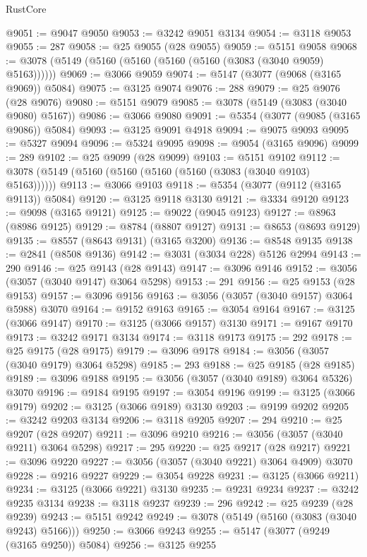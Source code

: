 \begin{lexlean}{RustCore}
\begin{coremodule}
@9051 := @9047 @9050
@9053 := @3242 @9051 @3134
@9054 := @3118 @9053
@9055 := 287
@9058 := @25 @9055 (@28 @9055)
@9059 := @5151 @9058
@9068 := @3078 (@5149 (@5160 (@5160 (@5160 (@5160 (@3083 (@3040 @9059) @5163))))))
@9069 := @3066 @9059
@9074 := @5147 (@3077 (@9068 (@3165 @9069)) @5084)
@9075 := @3125 @9074
@9076 := 288
@9079 := @25 @9076 (@28 @9076)
@9080 := @5151 @9079
@9085 := @3078 (@5149 (@3083 (@3040 @9080) @5167))
@9086 := @3066 @9080
@9091 := @5354 (@3077 (@9085 (@3165 @9086)) @5084)
@9093 := @3125 @9091 @4918
@9094 := @9075 @9093
@9095 := @5327 @9094
@9096 := @5324 @9095
@9098 := @9054 (@3165 @9096)
@9099 := 289
@9102 := @25 @9099 (@28 @9099)
@9103 := @5151 @9102
@9112 := @3078 (@5149 (@5160 (@5160 (@5160 (@5160 (@3083 (@3040 @9103) @5163))))))
@9113 := @3066 @9103
@9118 := @5354 (@3077 (@9112 (@3165 @9113)) @5084)
@9120 := @3125 @9118 @3130
@9121 := @3334 @9120
@9123 := @9098 (@3165 @9121)
@9125 := @9022 (@9045 @9123)
@9127 := @8963 (@8986 @9125)
@9129 := @8784 (@8807 @9127)
@9131 := @8653 (@8693 @9129)
@9135 := @8557 (@8643 @9131) (@3165 @3200)
@9136 := @8548 @9135
@9138 := @2841 (@8508 @9136)
@9142 := @3031 (@3034 @228) @5126 @2994
@9143 := 290
@9146 := @25 @9143 (@28 @9143)
@9147 := @3096 @9146
@9152 := @3056 (@3057 (@3040 @9147) @3064 @5298)
@9153 := 291
@9156 := @25 @9153 (@28 @9153)
@9157 := @3096 @9156
@9163 := @3056 (@3057 (@3040 @9157) @3064 @5988) @3070
@9164 := @9152 @9163
@9165 := @3054 @9164
@9167 := @3125 (@3066 @9147)
@9170 := @3125 (@3066 @9157) @3130
@9171 := @9167 @9170
@9173 := @3242 @9171 @3134
@9174 := @3118 @9173
@9175 := 292
@9178 := @25 @9175 (@28 @9175)
@9179 := @3096 @9178
@9184 := @3056 (@3057 (@3040 @9179) @3064 @5298)
@9185 := 293
@9188 := @25 @9185 (@28 @9185)
@9189 := @3096 @9188
@9195 := @3056 (@3057 (@3040 @9189) @3064 @5326) @3070
@9196 := @9184 @9195
@9197 := @3054 @9196
@9199 := @3125 (@3066 @9179)
@9202 := @3125 (@3066 @9189) @3130
@9203 := @9199 @9202
@9205 := @3242 @9203 @3134
@9206 := @3118 @9205
@9207 := 294
@9210 := @25 @9207 (@28 @9207)
@9211 := @3096 @9210
@9216 := @3056 (@3057 (@3040 @9211) @3064 @5298)
@9217 := 295
@9220 := @25 @9217 (@28 @9217)
@9221 := @3096 @9220
@9227 := @3056 (@3057 (@3040 @9221) @3064 @4909) @3070
@9228 := @9216 @9227
@9229 := @3054 @9228
@9231 := @3125 (@3066 @9211)
@9234 := @3125 (@3066 @9221) @3130
@9235 := @9231 @9234
@9237 := @3242 @9235 @3134
@9238 := @3118 @9237
@9239 := 296
@9242 := @25 @9239 (@28 @9239)
@9243 := @5151 @9242
@9249 := @3078 (@5149 (@5160 (@3083 (@3040 @9243) @5166)))
@9250 := @3066 @9243
@9255 := @5147 (@3077 (@9249 (@3165 @9250)) @5084)
@9256 := @3125 @9255

\end{coremodule}
\end{lexlean}
